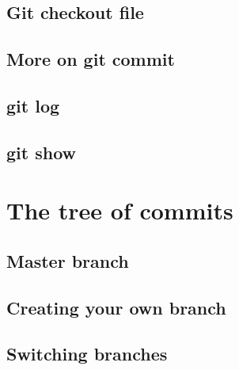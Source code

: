 \documentclass[10pt,a4paper]{beamer}
\begin{document}
\subsection{Git checkout file}
\begin{frame}

\end{frame}

\subsection{More on git commit}
\begin{frame}

\end{frame}

\subsection{git log}
\begin{frame}

\end{frame}

\subsection{git show}
\begin{frame}

\end{frame}


\section{The tree of commits}

\subsection{Master branch}
\begin{frame}

\end{frame}

\subsection{Creating your own branch}
\begin{frame}

\end{frame}

\subsection{Switching branches}
\begin{frame}

\end{frame}
\end{document}
